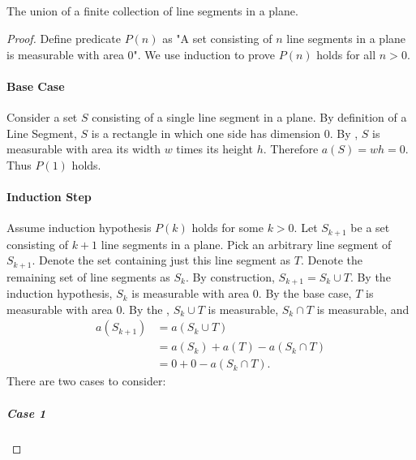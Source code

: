 \documentclass{article}
\begin{document}
\subsection*{}%
%

The union of a finite collection of line segments in a plane.

\begin{proof}

  Define predicate $P(n)$ as "A set consisting of $n$ line segments in a plane
    is measurable with area $0$".
  We use induction to prove $P(n)$ holds for all $n > 0$.

  \paragraph{Base Case}%

    Consider a set $S$ consisting of a single line segment in a plane.
    By definition of a Line Segment, $S$ is a rectangle in which one side has
      dimension $0$.
    By , $S$ is measurable with area its width $w$
      times its height $h$.
    Therefore $a(S) = wh = 0$.
    Thus $P(1)$ holds.

  \paragraph{Induction Step}%

    Assume induction hypothesis $P(k)$ holds for some $k > 0$.
    Let $S_{k+1}$ be a set consisting of $k + 1$ line segments in a plane.
    Pick an arbitrary line segment of $S_{k+1}$.
    Denote the set containing just this line segment as $T$.
    Denote the remaining set of line segments as $S_k$.
    By construction, $S_{k+1} = S_k \cup T$.
    By the induction hypothesis, $S_k$ is measurable with area $0$.
    By the base case, $T$ is measurable with area $0$.
    By the , $S_k \cup T$ is measurable,
      $S_k \cap T$ is measurable, and
      \begin{align}
        a(S_{k+1})
          & = a(S_k \cup T) \nonumber \\
          & = a(S_k) + a(T) - a(S_k \cap T) \nonumber \\
          & = 0 + 0 - a(S_k \cap T). \label{sub:exercise-1c-eq1}
      \end{align}
    There are two cases to consider:

    \subparagraph{Case 1}%


\end{proof}
\end{document}
